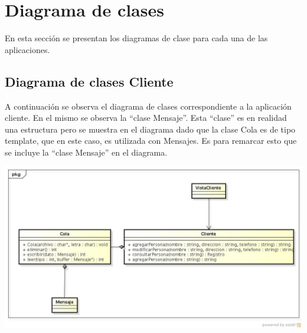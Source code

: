 \documentclass[11pt]{article}
\begin{document}
  \newline









\newpage

\section{Diagrama de clases}
 En esta secci\'on se presentan los diagramas de clase para cada una de las aplicaciones.
\subsection{Diagrama de clases Cliente}
A continuaci\'on se observa el diagrama de clases correspondiente a la aplicaci\'on cliente. En el mismo se observa la ``clase Mensaje''. 
Esta ``clase'' es en realidad una estructura pero se muestra en el diagrama dado que la clase Cola es de tipo template, que en este caso, es utilizada 
con Mensajes. Es para remarcar esto que se incluye la ``clase Mensaje'' en el diagrama.
\begin{center}
\includegraphics[scale=0.45,width=1.02\textwidth]{ClasesCliente} 
\end{center}
\end{document}
